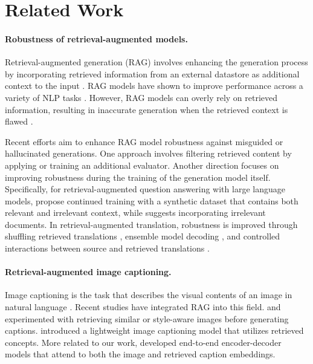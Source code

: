 \section{Related Work}
\label{sec:related}

\paragraph*{Robustness of retrieval-augmented models.}
Retrieval-augmented generation (RAG) involves enhancing the generation process by incorporating retrieved information from an external datastore as additional context to the input \cite{rag}. RAG models have shown to improve performance across a variety of NLP tasks \cite{mialon2023augmented}. 
However, RAG models can overly rely on retrieved information, resulting in inaccurate generation when the retrieved context is flawed \cite{yan2024corrective,ret-robust23}.

Recent efforts aim to enhance RAG model robustness against misguided or hallucinated generations. One approach involves filtering retrieved content \citep{wang2023learning, ret-robust23, racm3, yan2024corrective, asai2023self} by applying or training an additional evaluator. Another direction focuses on improving robustness during the training of the generation model itself. Specifically, for retrieval-augmented question answering with large language models, \citet{ret-robust23} propose continued training with a synthetic dataset that contains both relevant and irrelevant context, while \citet{cuconasu2024noise} suggests incorporating irrelevant documents. In retrieval-augmented translation, robustness is improved through shuffling retrieved translations \citep{hoang2022improving}, ensemble model decoding \citep{hao-etal-2023-rethinking}, and controlled interactions between source and retrieved translations \citep{hoang-etal-2023-improving}.






\paragraph{Retrieval-augmented image captioning.}
\label{para:raic}
Image captioning is the task that describes the visual contents of an image in natural language \cite{xu2015show, osman2023survey}. Recent studies have integrated RAG into this field. \citet{rag-transformer} and \citet{zhou-long-2023-style} experimented with retrieving similar or style-aware images before generating captions. \citet{li2023evcap} introduced a lightweight image captioning model that utilizes retrieved concepts. More related to our work, \citet{ramos-etal-2023-retrieval} developed end-to-end encoder-decoder models that attend to both the image and retrieved caption embeddings. 

